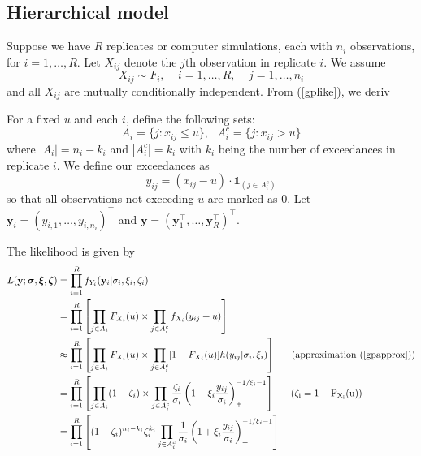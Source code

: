 \documentclass[12pt]{article}
\newcommand{\m}[1]{\mathbf{\bm{#1}}}
\newcommand{\ind}{\mathds{1}}
\newcommand{\m}[1]{\mathbf{\bm{#1}}}
\begin{document}

\subsection{Hierarchical model}
\label{hier}

Suppose we have $R$ replicates or computer simulations, each with $n_i$ observations, for $i=1,\ldots,R$. Let $X_{ij}$ denote the $j$th observation in replicate $i$. We assume
\[ X_{ij} \sim F_i,~~~~~i=1,\ldots,R,~~~~~j=1,\ldots,n_i \]
and all $X_{ij}$ are mutually conditionally independent. From (\ref{gplike}), we deriv

For a fixed $u$ and each $i$, define the following sets:
\[ A_i = \{j:x_{ij}\leq u\},~~~ A_i^c = \{j: x_{ij}>u\} \]
where $|A_i|=n_i-k_i$ and $|A_i^c|=k_i$ with $k_i$ being the number of exceedances in replicate $i$. We define our exceedances as
\[ y_{ij} = (x_{ij}-u)\cdot \ind_{(j \in A_i^c)} \]
so that all observations not exceeding $u$ are marked as $0$. Let $\m{y}_i=(y_{i,1},\ldots,y_{i,n_i})^\top$ and $\m{y}=(\m{y}_1^\top,\ldots,\m{y}_R^\top)^\top$.
\bigskip

The likelihood is given by
\begin{align}
L(\m{y}; \m{\sigma}, \m{\xi}, \m{\zeta}) &= \prod_{i=1}^R f_{Y_i}(\m{y}_i|\sigma_i,\xi_i,\zeta_i) \nonumber \\
&= \prod_{i=1}^R\left[\prod_{j\in A_i} F_{X_i}(u) \times \prod_{j\in A_i^c} f_{X_i}(y_{ij}+u)\right] \nonumber \\
&\approx \prod_{i=1}^R\left[\prod_{j\in A_i} F_{X_i}(u) \times \prod_{j\in A_i^c} [1-F_{X_i}(u)]h(y_{ij}|\sigma_i,\xi_i)\right]~~~~~\mathrm{(approximation~(\ref{gpapprox}))} \nonumber \\
&= \prod_{i=1}^R\left[\prod_{j\in A_i} (1-\zeta_i)\times \prod_{j\in A_i^c} \frac{\zeta_i}{\sigma_i}\left(1+\xi_i\frac{y_{ij}}{\sigma_i}\right)_+^{-1/\xi_i-1}\right]~~~~~\mathrm{(\zeta_i=1-F_{X_i}(u))} \nonumber \\
&= \prod_{i=1}^R\left[(1-\zeta_i)^{n_i-k_i}\zeta_i^{k_i}\prod_{j\in A_i^c}\frac{1}{\sigma_i}\left(1+\xi_i\frac{y_{ij}}{\sigma_i}\right)_+^{-1/\xi_i-1}\right] \label{biglike}
\end{align}
\end{document}
